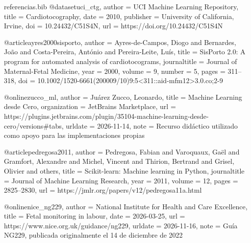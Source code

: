 \begin{filecontents*}{referencias.bib}
@dataset{uci_ctg,
  author       = {{UCI Machine Learning Repository}},
  title        = {Cardiotocography},
  date         = {2010},
  publisher    = {University of California, Irvine},
  doi          = {10.24432/C51S4N},
  url          = {https://doi.org/10.24432/C51S4N}
}

@article{ayres2000sisporto,
  author       = {Ayres-de-Campos, Diogo and Bernardes, Jo{\~{a}}o and Costa-Pereira, Ant{\'o}nio and Pereira-Leite, Lu{\'i}s},
  title        = {SisPorto 2.0: A program for automated analysis of cardiotocograms},
  journaltitle = {Journal of Maternal-Fetal Medicine},
  year         = {2000},
  volume       = {9},
  number       = {5},
  pages        = {311--318},
  doi          = {10.1002/1520-6661(200009/10)9:5<311::aid-mfm12>3.0.co;2-9}
}

@online{zucco_ml,
  author       = {Ju\'arez Zucco, Leonardo},
  title        = {Machine Learning desde Cero},
  organization = {JetBrains Marketplace},
  url          = {https://plugins.jetbrains.com/plugin/35104-machine-learning-desde-cero/versions#tabs},
  urldate      = {2026-11-14},
  note         = {Recurso did\'actico utilizado como apoyo para las implementaciones propias}
}

@article{pedregosa2011,
  author       = {Pedregosa, Fabian and Varoquaux, Ga\"el and Gramfort, Alexandre and Michel, Vincent and Thirion, Bertrand and Grisel, Olivier and others},
  title        = {Scikit-learn: Machine learning in Python},
  journaltitle = {Journal of Machine Learning Research},
  year         = {2011},
  volume       = {12},
  pages        = {2825--2830},
  url          = {https://jmlr.org/papers/v12/pedregosa11a.html}
}

@online{nice_ng229,
  author       = {{National Institute for Health and Care Excellence}},
  title        = {Fetal monitoring in labour},
  date         = {2026-03-25},
  url          = {https://www.nice.org.uk/guidance/ng229},
  urldate      = {2026-11-16},
  note         = {Guía NG229, publicada originalmente el 14 de diciembre de 2022}
}

\end{filecontents*}


